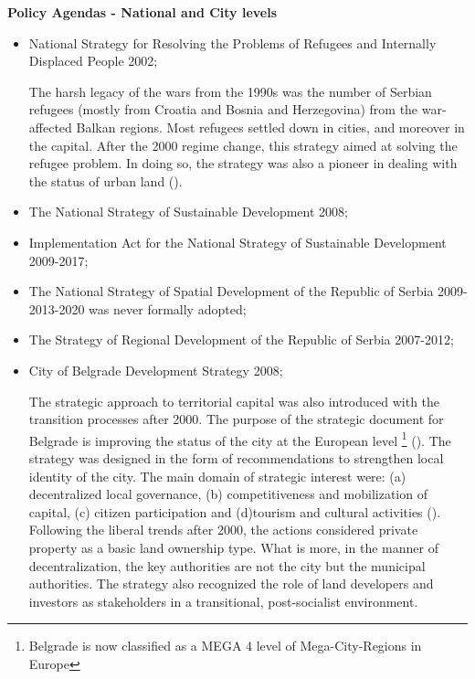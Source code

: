 \documentclass[11pt]{report}
\begin{document}
\textbf{Policy Agendas - National and City levels}

\begin{itemize}
\item National Strategy for Resolving the Problems of Refugees and Internally Displaced People 2002;

The harsh legacy of the wars from the 1990s was the number of Serbian refugees (mostly from Croatia and Bosnia and Herzegovina) from the war-affected Balkan regions. Most refugees settled down in cities, and moreover in the capital. After the 2000 regime change, this strategy aimed at solving the refugee problem. In doing so, the strategy was also a pioneer in dealing with the status of urban land (\href{Hirt}{\citealt{hirt_belgrade_2009}}).

\item The National Strategy of Sustainable Development 2008;

\item Implementation Act for the National Strategy of Sustainable Development 2009-2017;

\item The National Strategy of Spatial Development of the Republic of Serbia 2009-2013-2020 was never formally adopted;

\item The Strategy of Regional Development of the Republic of Serbia 2007-2012;

\item City of Belgrade Development Strategy 2008;

The strategic approach to territorial capital was also introduced with the transition processes after 2000.
The purpose of the strategic document for Belgrade is improving the status of the city at the European level
\footnote{Belgrade is now classified as a MEGA 4 level of Mega-City-Regions in Europe}
(\href{Nedovic}{\citealt{nedovic-budic_adjustment_2001}}).
The strategy was designed in the form of recommendations to strengthen local identity of the city. The main domain of strategic interest were: (a) decentralized local governance, (b) competitiveness and mobilization of capital, (c) citizen participation and (d)tourism and cultural activities  (\href{Vukmirovic}{\citealt{doytchinov_belgrade:_2015}}).
Following the liberal trends after 2000, the actions considered private property as a basic land ownership type. What is more, in the manner of decentralization, the key authorities are not the city but the municipal authorities. The strategy also recognized the role of land developers and investors as stakeholders in a transitional, post-socialist environment.
\end{itemize}
\end{document}
